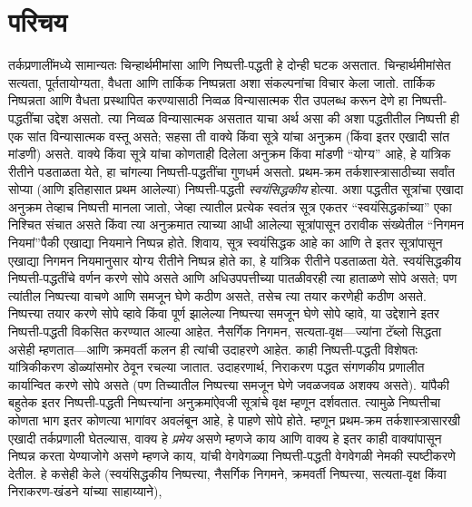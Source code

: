 \section{परिचय}\label{fol:prf:int:sec}
तर्कप्रणालींमध्ये सामान्यतः चिन्हार्थमीमांसा आणि निष्पत्ती-पद्धती हे दोन्ही घटक असतात. चिन्हार्थमीमांसेत सत्यता, पूर्ततायोग्यता,
वैधता आणि तार्किक निष्पन्नता अशा संकल्पनांचा विचार केला जातो.
तार्किक निष्पन्नता आणि वैधता प्रस्थापित करण्यासाठी निव्वळ विन्यासात्मक
रीत उपलब्ध करून देणे हा निष्पत्ती-पद्धतींचा उद्देश असतो. त्या
निव्वळ विन्यासात्मक असतात याचा अर्थ असा की अशा पद्धतीतील
निष्पत्ती ही एक सांत विन्यासात्मक वस्तू असते; सहसा ती
वाक्ये किंवा सूत्रे यांचा अनुक्रम (किंवा इतर एखादी सांत
मांडणी) असते. वाक्ये किंवा सूत्रे यांचा कोणताही दिलेला
अनुक्रम किंवा मांडणी ``योग्य'' आहे, हे यांत्रिक रीतीने पडताळता येते,
हा चांगल्या निष्पत्ती-पद्धतींचा गुणधर्म असतो.
प्रथम-क्रम तर्कशास्त्रासाठीच्या सर्वांत सोप्या (आणि इतिहासात प्रथम
आलेल्या) निष्पत्ती-पद्धती \emph{स्वयंसिद्धकीय} होत्या. अशा
पद्धतीत सूत्रांचा एखादा अनुक्रम तेव्हाच निष्पत्ती मानला
जातो, जेव्हा त्यातील प्रत्येक स्वतंत्र सूत्र एकतर
``स्वयंसिद्धकांच्या'' एका निश्चित संचात असते किंवा त्या अनुक्रमात
त्याच्या आधी आलेल्या सूत्रांपासून ठरावीक संख्येतील ``निगमन
नियमां''पैकी एखाद्या नियमाने निष्पन्न होते. शिवाय, सूत्र
स्वयंसिद्धक आहे का आणि ते इतर सूत्रांपासून एखाद्या निगमन
नियमानुसार योग्य रीतीने निष्पन्न होते का, हे यांत्रिक रीतीने पडताळता
येते. स्वयंसिद्धकीय निष्पत्ती-पद्धतींचे वर्णन करणे सोपे असते आणि
अधिउपपत्तीच्या पातळीवरही त्या हाताळणे सोपे असते; पण त्यांतील
निष्पत्त्या वाचणे आणि समजून घेणे कठीण असते, तसेच त्या तयार करणेही
कठीण असते.
निष्पत्त्या तयार करणे सोपे व्हावे किंवा पूर्ण झालेल्या
निष्पत्त्या समजून घेणे सोपे व्हावे, या उद्देशाने इतर
निष्पत्ती-पद्धती विकसित करण्यात आल्या आहेत. नैसर्गिक निगमन,
सत्यता-वृक्ष---ज्यांना टॅब्लो सिद्धता असेही म्हणतात---आणि क्रमवर्ती कलन
ही त्यांची उदाहरणे आहेत. काही निष्पत्ती-पद्धती विशेषतः
यांत्रिकीकरण डोळ्यांसमोर ठेवून रचल्या जातात. उदाहरणार्थ, निराकरण पद्धत
संगणकीय प्रणालीत कार्यान्वित करणे सोपे असते (पण तिच्यातील
निष्पत्त्या समजून घेणे जवळजवळ अशक्य असते). यांपैकी बहुतेक इतर
निष्पत्ती-पद्धती निष्पत्त्यांना अनुक्रमांऐवजी सूत्रांचे
वृक्ष म्हणून दर्शवतात. त्यामुळे निष्पत्तीचा कोणता भाग इतर
कोणत्या भागांवर अवलंबून आहे, हे पाहणे सोपे होते.
म्हणून प्रथम-क्रम तर्कशास्त्रासारखी एखादी तर्कप्रणाली घेतल्यास,
वाक्य हे \emph{प्रमेय} असणे म्हणजे काय आणि वाक्य हे
इतर काही वाक्यांपासून निष्पन्न करता येण्याजोगे असणे म्हणजे काय, यांची
वेगवेगळ्या निष्पत्ती-पद्धती वेगवेगळी नेमकी स्पष्टीकरणे देतील. हे
कसेही केले (स्वयंसिद्धकीय निष्पत्त्या, नैसर्गिक निगमने, क्रमवर्ती
निष्पत्त्या, सत्यता-वृक्ष किंवा निराकरण-खंडने यांच्या साहाय्याने),

